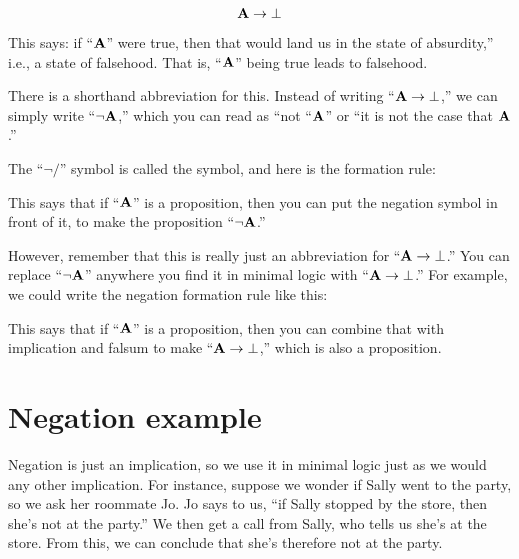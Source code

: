 \documentclass[../../../main.tex]{subfiles}
\begin{document}
\begin{equation*}
  \nd{A} \impl/ \falsum/
\end{equation*}

\noindent
This says: if ``$\mathbf{A}$'' were true, then that would land us in the state of absurdity,'' i.e., a state of falsehood. That is, ``$\mathbf{A}$'' being true leads to falsehood.

There is a shorthand abbreviation for this. Instead of writing ``$\nd{A} \impl/ \falsum/$,'' we can simply write ``$\neg/ \nd{A}$,'' which you can read as ``not ``$\mathbf{A}$'' or ``it is not the case that $\mathbf{A}$.'' 

The ``$\neg/$'' symbol is called the  symbol, and here is the formation rule:

\begin{prooftree*}
\end{prooftree*}

\noindent
This says that if ``$\mathbf{A}$'' is a proposition, then you can put the negation symbol in front of it, to make the proposition ``$\neg/ \nd{A}$.''

However, remember that this is really just an abbreviation for ``$\nd{A} \impl/ \falsum/$.'' You can replace ``$\neg/ \nd{A}$'' anywhere you find it in minimal logic with ``$\nd{A} \impl/ \falsum/$.'' For example, we could write the negation formation rule like this:

\begin{prooftree*}
\end{prooftree*}

\noindent
This says that if ``$\mathbf{A}$'' is a proposition, then you can combine that with implication and falsum to make ``$\nd{A} \impl/ \falsum/$,'' which is also a proposition. 


\section{Negation example}

Negation is just an implication, so we use it in minimal logic just as we would any other implication. For instance, suppose we wonder if Sally went to the party, so we ask her roommate Jo. Jo says to us, ``if Sally stopped by the store, then she's not at the party.'' We then get a call from Sally, who tells us she's at the store. From this, we can conclude that she's therefore not at the party. 
\end{document}
